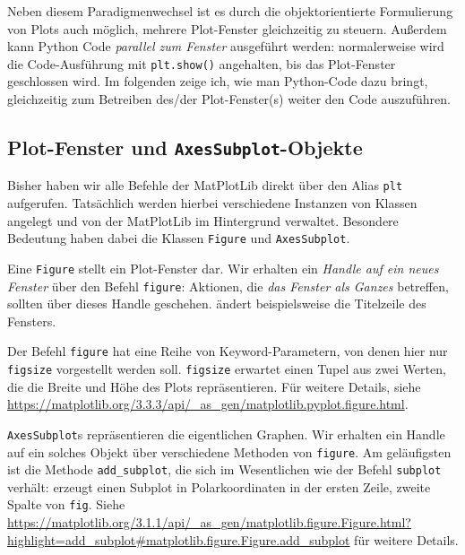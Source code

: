 Neben diesem Paradigmenwechsel ist es durch die objektorientierte Formulierung von Plots auch möglich, mehrere Plot-Fenster gleichzeitig zu steuern. Außerdem kann Python Code \emph{parallel zum Fenster} ausgeführt werden: normalerweise wird die Code-Ausführung mit \texttt{plt.show()} angehalten, bis das Plot-Fenster geschlossen wird. Im folgenden zeige ich, wie man Python-Code dazu bringt, gleichzeitig zum Betreiben des/der Plot-Fenster(s) weiter den Code auszuführen.

\subsection{Plot-Fenster und \texttt{AxesSubplot}-Objekte}
Bisher haben wir alle Befehle der MatPlotLib direkt über den Alias \texttt{plt} aufgerufen. Tatsächlich werden hierbei verschiedene Instanzen von Klassen angelegt und von der MatPlotLib im Hintergrund verwaltet. Besondere Bedeutung haben dabei die Klassen \texttt{Figure} und \texttt{AxesSubplot}.

Eine \texttt{Figure} stellt ein Plot-Fenster dar. Wir erhalten ein \emph{Handle auf ein neues Fenster} über den Befehl \texttt{figure}:
Aktionen, die \emph{das Fenster als Ganzes} betreffen, sollten über dieses Handle geschehen.
ändert beispielsweise die Titelzeile des Fensters.

Der Befehl \texttt{figure} hat eine Reihe von Keyword-Parametern, von denen hier nur \texttt{figsize} vorgestellt werden soll. \texttt{figsize} erwartet einen Tupel aus zwei Werten, die die Breite und Höhe des Plots repräsentieren. Für weitere Details, siehe \url{https://matplotlib.org/3.3.3/api/_as_gen/matplotlib.pyplot.figure.html}.

\texttt{AxesSubplot}s repräsentieren die eigentlichen Graphen. Wir erhalten ein Handle auf ein solches Objekt über verschiedene Methoden von \texttt{figure}. Am geläufigsten ist die Methode \texttt{add\_subplot}, die sich im Wesentlichen wie der Befehl \texttt{subplot} verhält:
erzeugt einen Subplot in Polarkoordinaten in der ersten Zeile, zweite Spalte von \texttt{fig}. 
Siehe \url{https://matplotlib.org/3.1.1/api/_as_gen/matplotlib.figure.Figure.html?highlight=add_subplot#matplotlib.figure.Figure.add_subplot} für weitere Details.

